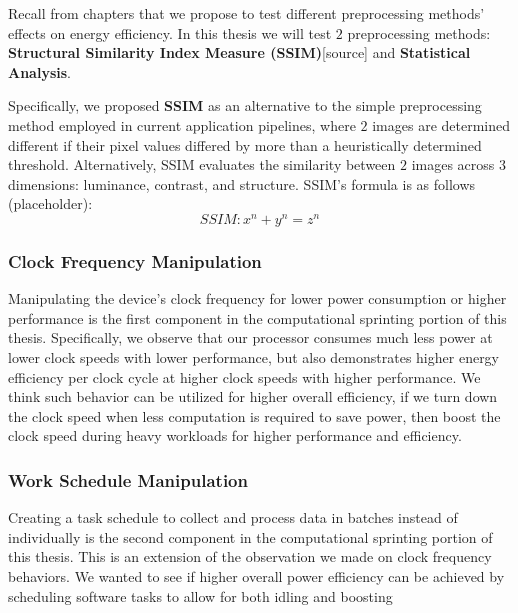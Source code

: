 \documentclass[twoside]{report}
\begin{document}
Recall from chapters that we propose to test different preprocessing methods' effects on energy efficiency. 
In this thesis we will test $2$ preprocessing methods: \textbf{Structural Similarity Index Measure (SSIM)}[source] 
and \textbf{Statistical Analysis}.

Specifically, we proposed \textbf{SSIM} as an alternative to the simple preprocessing method employed in current application
pipelines, where $2$ images are determined different if their pixel values differed by more than a 
heuristically determined threshold. Alternatively, SSIM evaluates the similarity between $2$ images across 
$3$ dimensions: luminance, contrast, and structure. SSIM's formula is as follows (placeholder): 
\[ SSIM: x^n + y^n = z^n \] 


\subsubsection{Clock Frequency Manipulation}
Manipulating the device's clock frequency for lower power consumption or higher performance 
is the first component in the computational sprinting portion of this thesis. Specifically, 
we observe that our processor consumes much less power at lower clock speeds with lower performance, 
but also demonstrates higher energy efficiency per clock cycle at higher clock speeds with higher performance.
We think such behavior can be utilized for higher overall efficiency, if we turn down the clock speed 
when less computation is required to save power, then boost the clock speed during heavy workloads for 
higher performance and efficiency.

\subsubsection{Work Schedule Manipulation}
Creating a task schedule to collect and process data in batches instead of individually
is the second component in the computational sprinting portion of this thesis. This is an extension 
of the observation we made on clock frequency behaviors. We wanted to see if higher overall 
power efficiency can be achieved by scheduling software tasks to allow for both idling and boosting
\end{document}
